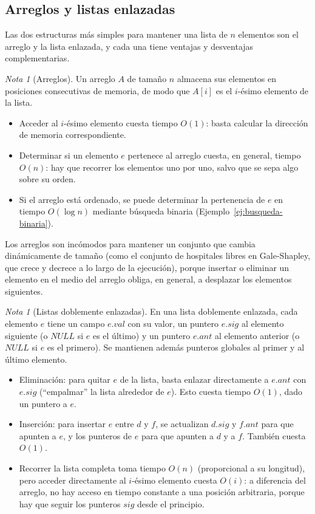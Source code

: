 \documentclass[12pt, spanish, oneside, openany]{book}
\theoremstyle{uprightplain}
\theoremstyle{definition}
\theoremstyle{remark}
\newtheorem{nota}[teorema]{Nota}
\theoremstyle{definition}
\begin{document}
\subsection{Arreglos y listas enlazadas}

Las dos estructuras más simples para mantener una lista de $n$ elementos son el arreglo y la lista enlazada, y cada una tiene ventajas y desventajas complementarias.

\begin{nota}[Arreglos]
Un arreglo $A$ de tamaño $n$ almacena sus elementos en posiciones consecutivas de memoria, de modo que $A[i]$ es el $i$-ésimo elemento de la lista.
\begin{itemize}
    \item Acceder al $i$-ésimo elemento cuesta tiempo $O(1)$: basta calcular la dirección de memoria correspondiente.
    \item Determinar si un elemento $e$ pertenece al arreglo cuesta, en general, tiempo $O(n)$: hay que recorrer los elementos uno por uno, salvo que se sepa algo sobre su orden.
    \item Si el arreglo está ordenado, se puede determinar la pertenencia de $e$ en tiempo $O(\log n)$ mediante búsqueda binaria (Ejemplo~\ref{ej:busqueda-binaria}).
\end{itemize}
Los arreglos son incómodos para mantener un conjunto que cambia dinámicamente de tamaño (como el conjunto de hospitales libres en Gale-Shapley, que crece y decrece a lo largo de la ejecución), porque insertar o eliminar un elemento en el medio del arreglo obliga, en general, a desplazar los elementos siguientes.
\end{nota}

\begin{nota}[Listas doblemente enlazadas]
En una lista doblemente enlazada, cada elemento $e$ tiene un campo $e.\mathit{val}$ con su valor, un puntero $e.\mathit{sig}$ al elemento siguiente (o $\mathit{NULL}$ si $e$ es el último) y un puntero $e.\mathit{ant}$ al elemento anterior (o $\mathit{NULL}$ si $e$ es el primero). Se mantienen además punteros globales al primer y al último elemento.
\begin{itemize}
    \item Eliminación: para quitar $e$ de la lista, basta enlazar directamente a $e.\mathit{ant}$ con $e.\mathit{sig}$ (``empalmar'' la lista alrededor de $e$). Esto cuesta tiempo $O(1)$, dado un puntero a $e$.
    \item Inserción: para insertar $e$ entre $d$ y $f$, se actualizan $d.\mathit{sig}$ y $f.\mathit{ant}$ para que apunten a $e$, y los punteros de $e$ para que apunten a $d$ y a $f$. También cuesta $O(1)$.
    \item Recorrer la lista completa toma tiempo $O(n)$ (proporcional a su longitud), pero acceder directamente al $i$-ésimo elemento cuesta $O(i)$: a diferencia del arreglo, no hay acceso en tiempo constante a una posición arbitraria, porque hay que seguir los punteros $\mathit{sig}$ desde el principio.
\end{itemize}
\end{nota}
\end{document}
